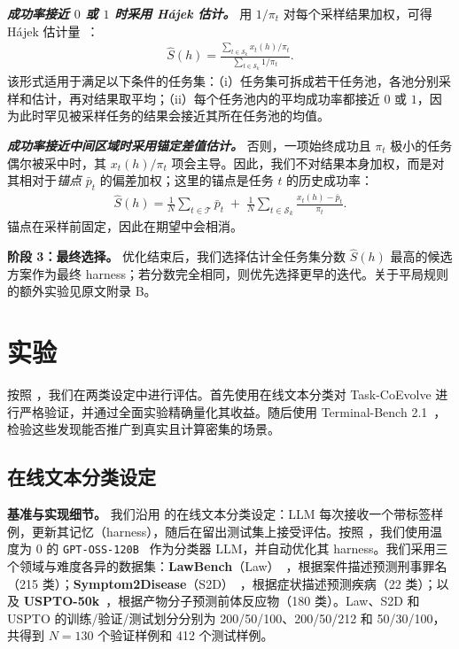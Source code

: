 \documentclass{article}
\begin{document}
\textbf{\textit{成功率接近 $0$ 或 $1$ 时采用 H\'ajek 估计。}}
用 $1/\pi_t$ 对每个采样结果加权，可得 H\'ajek 估计量~\citep{hajek1964asymptotic}：
\begin{equation}
\begin{aligned}
\hat{S}(h) = \frac{\sum_{t \in \mathcal{S}_k} x_t(h) / \pi_t}{\sum_{t \in \mathcal{S}_k} 1 / \pi_t}.
\end{aligned}
\label{eq:full_estimate}
\end{equation}
该形式适用于满足以下条件的任务集：（i）任务集可拆成若干任务池，各池分别采样和估计，再对结果取平均；（ii）每个任务池内的平均成功率都接近 $0$ 或 $1$，因为此时罕见被采样任务的结果会接近其所在任务池的均值。

\textbf{\textit{成功率接近中间区域时采用锚定差值估计。}}
否则，一项始终成功且 $\pi_t$ 极小的任务偶尔被采中时，其 $x_t(h)/\pi_t$ 项会主导。因此，我们不对结果本身加权，而是对其相对于\emph{锚点} $\bar{p}_t$ 的偏差加权；这里的锚点是任务 $t$ 的历史成功率：
\begin{equation}
\begin{aligned}
\hat{S}(h) = \frac{1}{N}\sum_{t \in \mathcal{T}} \bar{p}_t \;+\; \frac{1}{N}\sum_{t \in \mathcal{S}_k} \frac{x_t(h) - \bar{p}_t}{\pi_t}.
\end{aligned}
\label{eq:difference}
\end{equation}
锚点在采样前固定，因此在期望中会相消。

\textbf{阶段 3：最终选择。}
优化结束后，我们选择估计全任务集分数 $\hat{S}(h)$ 最高的候选方案作为最终 harness；若分数完全相同，则优先选择更早的迭代。关于平局规则的额外实验见原文附录 B。

\section{实验}
\label{sec:experiments}

按照 \citet{lee2026meta}，我们在两类设定中进行评估。首先使用在线文本分类对 Task-CoEvolve 进行严格验证，并通过全面实验精确量化其收益。随后使用 Terminal-Bench 2.1~\citep{merrill2026terminal}，检验这些发现能否推广到真实且计算密集的场景。

\subsection{在线文本分类设定}
\textbf{基准与实现细节。}
我们沿用 \citet{zhang2025ace,ye2026meta,lee2026meta} 的在线文本分类设定：LLM 每次接收一个带标签样例，更新其记忆（harness），随后在留出测试集上接受评估。按照 \citet{lee2026meta}，我们使用温度为 $0$ 的 \texttt{GPT-OSS-120B}~\citep{agarwal2025gpt} 作为分类器 LLM，并自动优化其 harness。我们采用三个领域与难度各异的数据集：\textbf{LawBench}（Law）~\citep{fei2024lawbench}，根据案件描述预测刑事罪名（215 类）；\textbf{Symptom2Disease}（S2D）~\citep{gretel2023symptom}，根据症状描述预测疾病（22 类）；以及 \textbf{USPTO-50k}~\citep{schneider2016s}，根据产物分子预测前体反应物（180 类）。Law、S2D 和 USPTO 的训练/验证/测试划分分别为 200/50/100、200/50/212 和 50/30/100，共得到 $N=130$ 个验证样例和 412 个测试样例。
\end{document}
